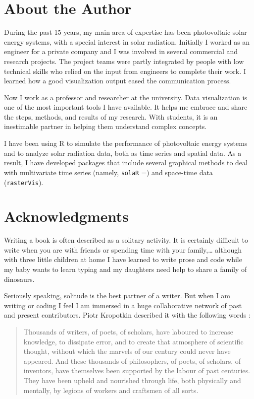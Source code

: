 \documentclass[smallroyalvopaper]{memoir}
\begin{document}
\section{About the Author}
\label{sec:orgheadline11}
\label{sec:aboutMe}

During the past 15 years, my main area of expertise has been photovoltaic solar energy systems, with a special interest in solar radiation.
Initially I worked as an engineer for a private company and I was involved in several commercial and research projects. The project teams were partly integrated by people with low technical skills who relied on the input from engineers to complete their work. I learned how a good visualization output eased the communication process. 

Now I work as a professor and researcher at the university. Data visualization is one of the most important tools I have available. It helps me embrace and share the steps, methods, and results of my research. With students, it is an inestimable partner in helping them understand complex concepts.

I have been using \textsf{R} to simulate the performance of photovoltaic energy systems and to analyze solar radiation data, both as time series and spatial data. As a result, I have developed packages that include several graphical methods to deal with multivariate time series (namely, \texttt{solaR} \cite{Perpinan2012b}=) and space-time data (\texttt{rasterVis}). 

\section{Acknowledgments}
\label{sec:orgheadline12}
\label{sec:acknow}

Writing a book is often described as a solitary activity. It is certainly difficult to write when you are with friends or spending time with your family,\ldots{} although with three little children at home I have learned to write prose and code while my baby wants to learn typing and my daughters need help to share a family of dinosaurs. 

Seriously speaking, solitude is the best partner of a writer. But when I am writing or coding I feel I am immersed in a huge collaborative network of past and present contributors. Piotr Kropotkin described it with the following words \cite{Kropotkin1906}:

\begin{quote}
Thousands of writers, of poets, of scholars, have laboured to increase knowledge, to dissipate error, and to create that atmosphere of scientific thought, without which the marvels of our century could never have appeared. And these thousands of philosophers, of poets, of scholars, of inventors, have themselves been supported by the labour of past centuries. They have been upheld and nourished through life, both physically and mentally, by legions of workers and craftsmen of all sorts.
\end{quote}
\end{document}
